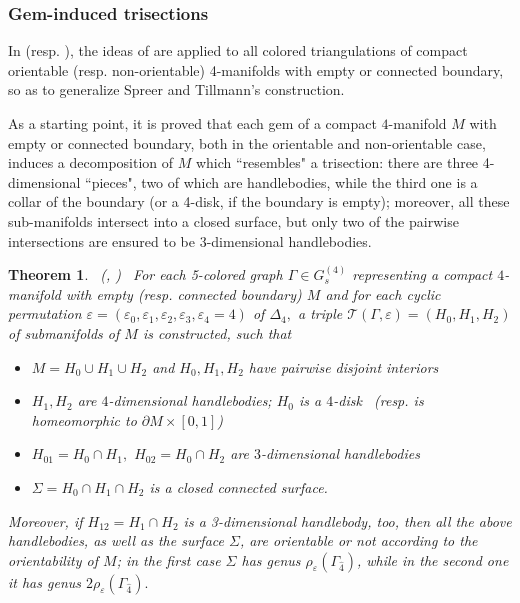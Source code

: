 \documentclass[12pt,a4paper]{article}
\newtheorem{theorem}[lemma]{Theorem}
\newcommand{\e}{\varepsilon}
\newcommand{\G}{\Gamma}
\begin{document}
\bigskip 


\subsubsection{Gem-induced trisections}  \label{sss Gem-induced trisections} \par \noindent

In  \cite{Casali-Cristofori gem-induced} (resp. \cite{Casali-Cristofori trisection bis}), the ideas of \cite{Bell-et-al} are applied to all colored triangulations of compact orientable (resp. non-orientable) 4-manifolds with empty or connected boundary, so as to generalize Spreer and Tillmann’s construction. 

As a starting point, it is proved that each gem of a compact $4$-manifold $M$ with empty or connected boundary, both in the orientable and non-orientable case, induces a decomposition of $M$ which ``resembles" a trisection:  there are three 4-dimensional ``pieces", two of which are handlebodies, while the third one is a collar of the boundary (or a 4-disk, if the boundary is empty); moreover, all these sub-manifolds
intersect into a closed surface, but only two of the pairwise intersections are ensured to be 3-dimensional handlebodies. 

\begin{theorem}  \ {\rm (\cite{Casali-Cristofori gem-induced}, \cite{Casali-Cristofori trisection bis})} \  \label{th: gem-induced trisection}
For each 5-colored graph $\Gamma \in G_s^{(4)}$ representing a compact $4$-manifold with empty (resp. connected boundary) $M$ and for 
each cyclic permutation $\varepsilon= (\e_0,\e_1,\e_2,\e_3, \e_4=4)$ of $\Delta_4,$ 
a  triple $\mathcal  T(\Gamma, \varepsilon) =(H_{0},H_{1},H_{2})$ of submanifolds of $M$ is constructed, such that
 \begin{itemize}
 \item [(a)]  $M = H_{0}\cup H_{1}\cup H_{2}$ and $H_{0}, H_{1}, H_{2}$ have pairwise disjoint interiors 
 \item [(b)]  $H_{1},H_{2}$ are $4$-dimensional handlebodies; $H_{0}$ is a $4$-disk \  (resp. is  homeomorphic to $\partial M \times [0,1]$)
\item [(c)] $H_{01}=H_{0}\cap H_{1},$  $H_{02}=H_{0}\cap H_{2}$ are $3$-dimensional handlebodies
 \item [(d)] $\Sigma = H_{0}\cap H_{1}\cap H_{2}$  is a closed connected surface. 
 \end{itemize}
 
 Moreover, if $H_{12}=H_1\cap H_2$ is a 3-dimensional handlebody, too, then all the above handlebodies, as well as the surface $\Sigma$, are orientable or not according to the orientability of $M$; in the first case $\Sigma$ has genus $\rho_{\varepsilon}(\G_{\hat 4})$, while in the second one it has genus $2\rho_{\varepsilon}(\G_{\hat 4}).$ 
\end{theorem} 
\end{document}
